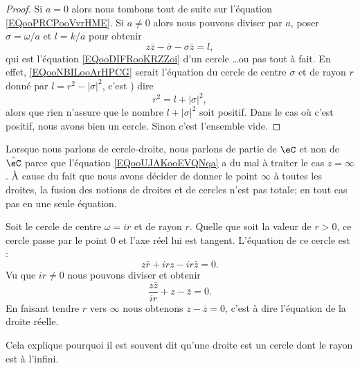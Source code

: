 \begin{proof}
    Si \( a=0\) alors nous tombons tout de suite sur l'équation \eqref{EQooPRCPooVvrHME}. Si \( a\neq 0\) alors nous pouvons diviser par \( a\), poser \( \sigma=\omega/a\) et \( l=k/a\) pour obtenir
    \begin{equation}        \label{EQooNBILooArHPCG}
        z\bar z-\bar\sigma-\sigma\bar z=l,
    \end{equation}
    qui est l'équation \eqref{EQooDIFRooKRZZoi} d'un cercle \ldots ou pas tout à fait. En effet, \eqref{EQooNBILooArHPCG} serait l'équation du cercle de centre \( \sigma\) et de rayon \( r\) donné par $l=r^2-| \sigma |^2$, c'est ) dire
    \begin{equation}
        r^2=l+| \sigma |^2,
    \end{equation}
    alors que rien n'assure que le nombre \( l+| \sigma |^2\) soit positif. Dans le cas où c'est positif, nous avons bien un cercle. Sinon c'est l'ensemble vide.
\end{proof}

\begin{remark}      \label{REMooBMAEooHDvNID}
    Lorsque nous parlons de cercle-droite, nous parlons de partie de \( \eC\) et non de \( \hat \eC\) parce que l'équation \eqref{EQooUJAKooEVQNqa} a du mal à traiter le cas \( z=\infty\). À cause du fait que nous avons décider de donner le point \( \infty\) à toutes les droites, la fusion des notions de droites et de cercles n'est pas totale; en tout cas pas en une seule équation.
\end{remark}

\begin{example}      \label{EXooKFBIooOJKjGL}
    Soit le cercle de centre \( \omega=ir\) et de rayon \( r\). Quelle que soit la valeur de \( r>0\), ce cercle passe par le point \( 0\) et l'axe réel lui est tangent. L'équation de ce cercle est :
    \begin{equation}
        z\bar r+irz-ir\bar z=0.
    \end{equation}
    Vu que \( ir\neq 0\) nous pouvons diviser et obtenir
    \begin{equation}
        \frac{ z\bar z }{ ir }+z-\bar z=0.
    \end{equation}
    En faisant tendre \( r\) vers \( \infty\) nous obtenons \( z-\bar z=0\), c'est à dire l'équation de la droite réelle.

    Cela explique pourquoi il est souvent dit qu'une droite est un cercle dont le rayon est à l'infini.
\end{example}

